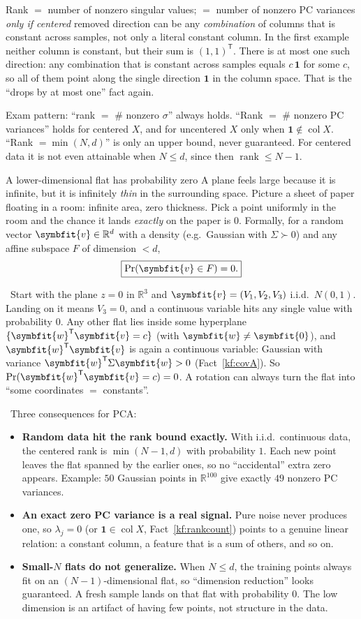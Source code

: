 \documentclass[11pt]{article}
\newcommand{\bm}[1]{\symbfit{#1}}
\newcounter{keyfact}
\newcommand{\why}{\par\smallskip{\color{intgreen}\textbf{Why.}}\ }
\newcommand{\sowhat}{\par\smallskip{\color{corpurple}\textbf{So what.}}\ }
\newcommand{\R}{\mathbb{R}}
\newcommand{\vw}{\bm{w}}
\newcommand{\one}{\symbf{1}}
\newcommand{\T}{^{\mathsf T}}
\newcommand{\rank}{\operatorname{rank}}
\newcommand{\col}{\operatorname{col}}
\begin{document}
\begin{keyfactbox}{Rank $=$ number of nonzero singular values; $=$ number of nonzero PC variances \emph{only if centered}}
removed direction can be any \emph{combination} of columns that is constant across samples, not only a literal constant
column. In the first example neither column is constant, but their sum is $(1,1)\T$. There is at most one such
direction: any combination that is constant across samples equals $c\,\one$ for some $c$, so all of them point along
the single direction $\one$ in the column space. That is the ``drops by at most one'' fact again.
\par\smallskip
Exam pattern: ``rank $=$ \# nonzero $\sigma$'' always holds. ``Rank $=$ \# nonzero PC variances'' holds for centered $X$, and for
uncentered $X$ only when $\one\notin\col X$. ``Rank $=\min(N,d)$'' is only an upper bound, never guaranteed. For centered data
it is not even attainable when $N\le d$, since then $\rank\le N-1$.
\end{keyfactbox}

\begin{keyfactbox}{A lower-dimensional flat has probability zero}\label{kf:measurezero}
A plane feels large because it is infinite, but it is infinitely \emph{thin} in the surrounding space. Picture a
sheet of paper floating in a room: infinite area, zero thickness. Pick a point uniformly in the room and the
chance it lands \emph{exactly} on the paper is $0$. Formally, for a random vector $\bm v\in\R^d$ with a density
(e.g.\ Gaussian with $\Sigma\succ0$) and any affine subspace $F$ of dimension $<d$,
\[
\boxed{\Pr(\bm v\in F)=0.}
\]
\why Start with the plane $z=0$ in $\R^3$ and $\bm v=(V_1,V_2,V_3)$ i.i.d.\ $N(0,1)$. Landing on it means $V_3=0$, and a continuous
variable hits any single value with probability $0$. Any other flat lies inside some hyperplane $\{\vw\T\bm v=c\}$
(with $\vw\ne\bm0$), and $\vw\T\bm v$ is again a continuous variable: Gaussian with variance $\vw\T\Sigma\vw>0$ (Fact~\ref{kf:covA}). So
$\Pr(\vw\T\bm v=c)=0$. A rotation can always turn the flat into ``some coordinates $=$ constants''.
\sowhat Three consequences for PCA:
\begin{itemize}[nosep]
\item \textbf{Random data hit the rank bound exactly.} With i.i.d.\ continuous data, the centered rank is
$\min(N-1,d)$ with probability $1$. Each new point leaves the flat spanned by the earlier ones, so no
``accidental'' extra zero appears. Example: $50$ Gaussian points in $\R^{100}$ give exactly $49$ nonzero PC variances.
\item \textbf{An exact zero PC variance is a real signal.} Pure noise never produces one, so $\lambda_j=0$ (or $\one\in\col X$, Fact~\ref{kf:rankcount})
points to a genuine linear relation: a constant column, a feature that is a sum of others, and so on.
\item \textbf{Small-$N$ flats do not generalize.} When $N\le d$, the training points always fit on an $(N-1)$-dimensional flat,
so ``dimension reduction'' looks guaranteed. A fresh sample lands on that flat with probability $0$. The low
dimension is an artifact of having few points, not structure in the data.
\end{itemize}
\end{keyfactbox}
\end{document}
